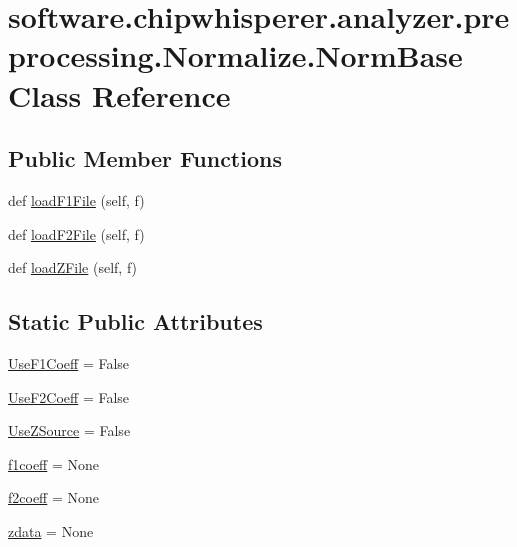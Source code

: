 \hypertarget{classsoftware_1_1chipwhisperer_1_1analyzer_1_1preprocessing_1_1Normalize_1_1NormBase}{}\section{software.\+chipwhisperer.\+analyzer.\+preprocessing.\+Normalize.\+Norm\+Base Class Reference}
\label{classsoftware_1_1chipwhisperer_1_1analyzer_1_1preprocessing_1_1Normalize_1_1NormBase}
\subsection*{Public Member Functions}
\begin{DoxyCompactItemize}
\item 
def \hyperlink{classsoftware_1_1chipwhisperer_1_1analyzer_1_1preprocessing_1_1Normalize_1_1NormBase_a0e0eabca0fc3729b8a028db1a7be7bc5}{load\+F1\+File} (self, f)
\item 
def \hyperlink{classsoftware_1_1chipwhisperer_1_1analyzer_1_1preprocessing_1_1Normalize_1_1NormBase_ac52e2b6a99a47dbca28c0461f07e1754}{load\+F2\+File} (self, f)
\item 
def \hyperlink{classsoftware_1_1chipwhisperer_1_1analyzer_1_1preprocessing_1_1Normalize_1_1NormBase_a73e5964043e35795005fadc9914656b5}{load\+Z\+File} (self, f)
\end{DoxyCompactItemize}
\subsection*{Static Public Attributes}
\begin{DoxyCompactItemize}
\item 
\hyperlink{classsoftware_1_1chipwhisperer_1_1analyzer_1_1preprocessing_1_1Normalize_1_1NormBase_af9b608d0084373ff2e31838ffd0e3940}{Use\+F1\+Coeff} = False
\item 
\hyperlink{classsoftware_1_1chipwhisperer_1_1analyzer_1_1preprocessing_1_1Normalize_1_1NormBase_a82f2aad297e3b802a6ed67e59bf86877}{Use\+F2\+Coeff} = False
\item 
\hyperlink{classsoftware_1_1chipwhisperer_1_1analyzer_1_1preprocessing_1_1Normalize_1_1NormBase_ab686b496043938c02f38cf402b355968}{Use\+Z\+Source} = False
\item 
\hyperlink{classsoftware_1_1chipwhisperer_1_1analyzer_1_1preprocessing_1_1Normalize_1_1NormBase_ad2870d88ba58ea7c960785f6d06dc347}{f1coeff} = None
\item 
\hyperlink{classsoftware_1_1chipwhisperer_1_1analyzer_1_1preprocessing_1_1Normalize_1_1NormBase_a0aa99eac0acf2e3225a3be102c2cc8c4}{f2coeff} = None
\item 
\hyperlink{classsoftware_1_1chipwhisperer_1_1analyzer_1_1preprocessing_1_1Normalize_1_1NormBase_aea1a934b880f98f579b0199463978e59}{zdata} = None
\end{DoxyCompactItemize}


